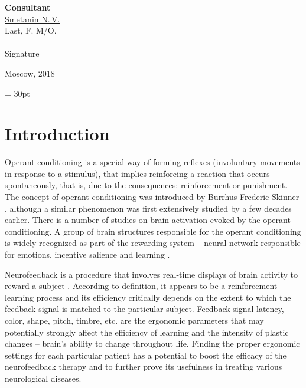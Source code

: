 \documentclass[14pt,a4paper]{scrartcl}
\begin{document}
\begin{titlepage}
	\hfill\begin{minipage}{0.4\textwidth}
		\textbf{Consultant}\\[0.3cm]
		\underline{Smetanin N.\,V.} \\
		\scriptsize{Last, F. M/O.}\\\\
		\underline{\hspace{7cm}}
		\scriptsize{Signature}\\
			\end{minipage}

	    \vfill
	    \vfill
	    \vfill  

		\begin{center}
		\vfill
		  Moscow, 2018
		\end{center}
	\end{titlepage}


\newpage
\tableofcontents
\fancyhf{} 
\renewcommand{\headrulewidth}{0pt} 
\footskip = 30pt
\fancyfoot[R]{\thepage} 
\pagestyle{fancy}
\fancypagestyle{plain}{
  \fancyhf{}
  \renewcommand{\headrulewidth}{0pt}
  \fancyhf[lef,rof]{\thepage}
}




\newpage
\section{Introduction}
\label{sec:Introduction}

Operant conditioning is a special way of forming reflexes (involuntary movements in response to a stimulus), that implies reinforcing a reaction that occurs spontaneously, that is, due to the consequences: reinforcement or punishment. The concept of operant conditioning was introduced by Burrhus Frederic Skinner \cite{Skinner1971a,Skinner1971,Skinner1950,Jones1939}, although a similar phenomenon was first extensively studied by \cite{Thorndike1898} a few decades earlier. There is a number of studies on brain activation evoked by the operant conditioning. A group of brain structures responsible for the operant conditioning is widely recognized as part of the rewarding system – neural network responsible for emotions, incentive salience and learning \cite{Schultz2015}. 

Neurofeedback is a procedure that involves real-time displays of brain activity to reward a subject \cite{Kamiya2011}. According to definition, it appears to be a reinforcement learning process and its efficiency critically depends on the extent to which the feedback signal is matched to the particular subject. Feedback signal latency, color, shape, pitch, timbre, etc. are the ergonomic parameters that may potentially strongly affect the efficiency of learning and the intensity of plastic changes – brain’s ability to change throughout life. Finding the proper ergonomic settings for each particular patient has a potential to boost the efficacy of the neurofeedback therapy and to further prove its usefulness in treating various neurological diseases.
\newpage
\end{document}
